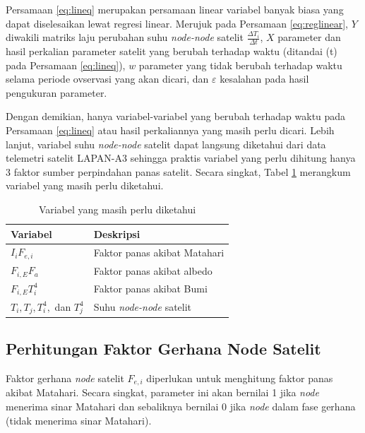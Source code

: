 Persamaan \ref{eq:lineq} merupakan persamaan linear variabel banyak biasa yang
dapat diselesaikan lewat regresi linear. Merujuk pada Persamaan
\ref{eq:reglinear}, $Y$ diwakili matriks laju perubahan suhu \textit{node-node}
satelit $\frac{\Delta T_i}{\Delta t}$, $X$ parameter dan hasil perkalian
parameter satelit yang berubah terhadap waktu (ditandai (t) pada Persamaan
\ref{eq:lineq}), $w$ parameter yang tidak berubah terhadap waktu selama periode
ovservasi yang akan dicari, dan $\varepsilon$ kesalahan pada hasil pengukuran parameter.  

Dengan demikian, hanya variabel-variabel yang berubah terhadap waktu pada
Persamaan \ref{eq:lineq} atau hasil perkaliannya yang masih perlu dicari.
Lebih lanjut, variabel suhu \textit{node-node} satelit dapat langsung
diketahui dari data telemetri satelit LAPAN-A3 sehingga praktis variabel yang
perlu dihitung hanya 3 faktor sumber perpindahan panas satelit. Secara singkat,
Tabel \ref{table:unknown} merangkum variabel yang masih perlu diketahui.

\begin{table}[!ht]
\begin{center}
\caption{Variabel yang masih perlu diketahui}
\label{table:unknown}
\begin{tabular}{|l|l|}
\hline
Variabel & Deskripsi \\ \hline
	$I_i F_{e,i}$        & Faktor panas akibat Matahari         \\ \hline
	$F_{i,E} F_a$        & Faktor panas akibat albedo         \\ \hline
	$F_{i,E} T_i^4$        & Faktor panas akibat Bumi         \\ \hline
	$T_i, T_j, T_i^4,$ dan $T_j^4$        & Suhu \textit{node-node} satelit         \\ \hline
\end{tabular}
\end{center}
\vspace{-5mm}
\end{table}

\subsection{Perhitungan Faktor Gerhana Node Satelit}

Faktor gerhana \textit{node} satelit $F_{e,i}$ diperlukan untuk menghitung faktor panas
akibat Matahari. Secara singkat, parameter ini akan bernilai 1 jika \textit{node}
menerima sinar Matahari dan sebaliknya bernilai 0 jika \textit{node} dalam fase gerhana
(tidak menerima sinar Matahari).

